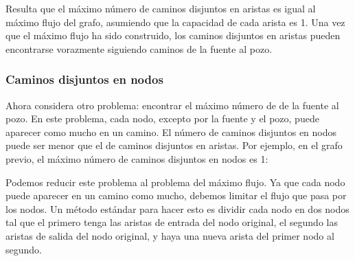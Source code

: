 Resulta que el máximo número de caminos disjuntos en aristas es igual
al máximo flujo del grafo, asumiendo que la capacidad de cada arista
es 1. Una vez que el máximo flujo ha sido construido, los caminos
disjuntos en aristas pueden encontrarse vorazmente siguiendo caminos de
la fuente al pozo.

\subsubsection{Caminos disjuntos en nodos}

Ahora considera otro problema: encontrar el máximo número de
 de la fuente al pozo. En este problema,
cada nodo, excepto por la fuente y el pozo, puede aparecer como mucho
en un camino. El número de caminos disjuntos en nodos puede ser
menor que el de caminos disjuntos en aristas. Por ejemplo, en el
grafo previo, el máximo número de caminos disjuntos en nodos es 1:

\begin{center}
\end{center}

Podemos reducir este problema al problema del máximo flujo. Ya que
cada nodo puede aparecer en un camino como mucho, debemos limitar el
flujo que pasa por los nodos. Un método estándar para hacer esto es
dividir cada nodo en dos nodos tal que el primero tenga las aristas
de entrada del nodo original, el segundo las aristas de salida del
nodo original, y haya una nueva arista del primer nodo al segundo.

